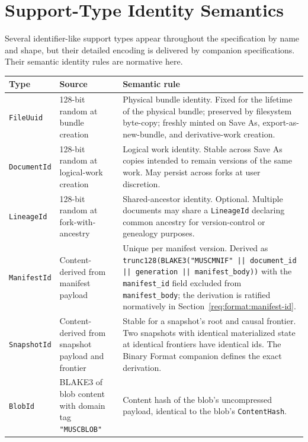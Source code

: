 \documentclass[11pt,letterpaper]{report}
\begin{document}
\section{Support-Type Identity Semantics}
\label{sec:deferred:support-types}

Several identifier-like support types appear throughout the
specification by name and shape, but their detailed encoding is
delivered by companion specifications. Their semantic identity
rules are normative here.

\begin{longtable}{p{3.4cm} p{3.6cm} p{6.6cm}}
  \toprule
  \textbf{Type} & \textbf{Source} & \textbf{Semantic rule} \\
  \midrule
  \endhead

  \texttt{FileUuid} &
  128-bit random at bundle creation &
  Physical bundle identity. Fixed for the lifetime of the
  physical bundle; preserved by filesystem byte-copy; freshly
  minted on Save As, export-as-new-bundle, and derivative-work
  creation. \\

  \texttt{DocumentId} &
  128-bit random at logical-work creation &
  Logical work identity. Stable across Save As copies intended
  to remain versions of the same work. May persist across forks
  at user discretion. \\

  \texttt{LineageId} &
  128-bit random at fork-with-ancestry &
  Shared-ancestor identity. Optional. Multiple documents may
  share a \texttt{LineageId} declaring common ancestry for
  version-control or genealogy purposes. \\

  \texttt{ManifestId} &
  Content-derived from manifest payload &
  Unique per manifest version. Derived as
  \texttt{trunc128(BLAKE3("MUSCMNIF" || document\_id ||
  generation || manifest\_body))} with the \texttt{manifest\_id}
  field excluded from \texttt{manifest\_body}; the derivation is
  ratified normatively in
  Section~\ref{req:format:manifest-id}. \\

  \texttt{SnapshotId} &
  Content-derived from snapshot payload and frontier &
  Stable for a snapshot's root and causal frontier. Two snapshots
  with identical materialized state at identical frontiers have
  identical ids. The Binary Format companion defines the exact
  derivation. \\

  \texttt{BlobId} &
  BLAKE3 of blob content with domain tag \texttt{"MUSCBLOB"} &
  Content hash of the blob's uncompressed payload, identical to
  the blob's \texttt{ContentHash}. \\


\end{longtable}
\end{document}

